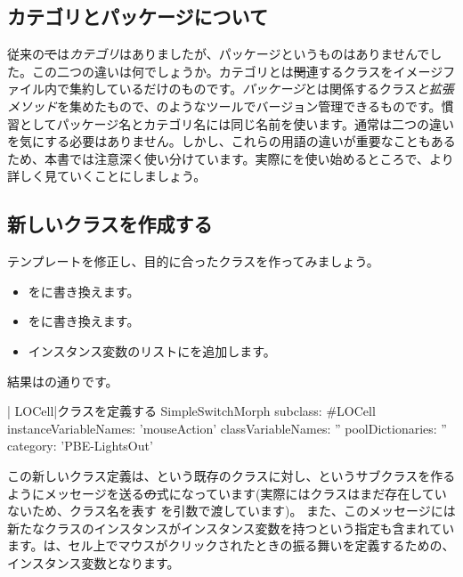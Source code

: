 \documentclass[a4paper,10pt,twoside]{book}
\begin{document}
\subsection{カテゴリとパッケージについて}

従来の\st では\emph{カテゴリ}はありましたが、パッケージというものはありませんでした。この二つの違いは何でしょうか。カテゴリとは\st 関連するクラスをイメージファイル内で集約しているだけのものです。\emph{パッケージ}とは関係するクラス\emph{と拡張メソッド}を集めたもので、のようなツールでバージョン管理できるものです。慣習としてパッケージ名とカテゴリ名には同じ名前を使います。通常は二つの違いを気にする必要はありません。しかし、これらの用語の違いが重要なこともあるため、本書では注意深く使い分けています。実際にを使い始めるところで、より詳しく見ていくことにしましょう。


\subsection{新しいクラスを作成する}

テンプレートを修正し、目的に合ったクラスを作ってみましょう。

\begin{itemize}
  \item {}をに書き換えます。
  \item {}をに書き換えます。
  \item インスタンス変数のリストにを追加します。
\end{itemize}
結果はの通りです。

\begin{classdef}[firstClassDef]{\ct| LOCell|クラスを定義する}
SimpleSwitchMorph subclass: #LOCell
   instanceVariableNames: 'mouseAction'
   classVariableNames: ''
   poolDictionaries: ''
   category: 'PBE-LightsOut'
\end{classdef}

この新しいクラス定義は、という既存のクラスに対し、というサブクラスを作るようにメッセージを送る\st の式になっています(実際にはクラスはまだ存在していないため、クラス名を表す を引数で渡しています)。
また、このメッセージには新たなクラスのインスタンスがインスタンス変数を持つという指定も含まれています。は、セル上でマウスがクリックされたときの振る舞いを定義するための、インスタンス変数となります。
\end{document}
